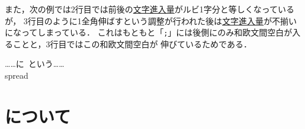 \documentclass[a4paper,10ptj]{ltjsarticle}
\begin{document}
また，次の例では2行目では前後の\underline{文字進入量}がルビ1字分と等しくなっているが，
3行目のように1全角伸ばすという調整が行われた後は\underline{文字進入量}が不揃いになってしまっている．
これはもともと「\texttt{;}」には後側にのみ和欧文間空白が入ることと，3行目ではこの和欧文間空白が
伸びているためである．
\begin{LTXexample}[preset=\Large,width=0.4\textwidth]
\leavevmode\hbox{……に%
  という……}\\
\hbox spread
\end{LTXexample}

\newpage
\section{について}
\end{document}
